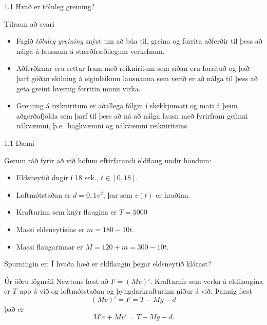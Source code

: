\begin{frame}{1.1 Hvað er töluleg greining?} \pause
\smallskip
\begin{block}{Tilraun að svari} 
\begin{itemize} 
\item Fagið {\it töluleg greining} snýst um að búa til, greina og forrita
aðferðir til þess að nálga á lausnum á stærðfræðilegum
verkefnum.\pause
\item  Aðferðirnar eru settar fram með reikniritum sem síðan eru
forrituð og það  þarf góðan skilning á eiginleikum lausnanna sem verið
er að nálga til þess að geta greint hvernig forritin munu virka.\pause
\item Greining á reikniritum er aðallega fólgin í skekkjumati og
mati á þeim aðgerðafjölda sem þarf til þess að ná að nálga lausn með
fyrirfram gefinni nákvæmni, \pause þ.e.~hagkvæmni og nákvæmni reikniritsins.
\end{itemize} 
\end{block}
\end{frame}

\begin{frame}{1.1 Dæmi}
 \begin{block}{}
Gerum ráð fyrir að við höfum eftirfarandi eldflaug undir höndum: \pause
\begin{itemize}
 \item Eldsneytið dugir í 18 sek., $t\in [0,18]$.
\item Loftmótstaðan er $d=0,1v^2$, þar sem $v(t)$ er hraðinn.
\item Krafturinn sem knýr flaugina er $T=5000$ 
\item Massi eldsneytisins er $m=180-10t$.
\item Massi flaugarinnar er $M = 120 + m = 300 - 10t$.
\end{itemize}
\pause

Spurningin er: Í hvaða hæð er eldflaugin þegar eldsneytið klárast?

\pause

Úr öðru lögmáli Newtons fæst að $F = (Mv)'$. \pause
Kraftarnir sem verka á eldflaugina er $T$ upp á við og 
loftmótstaðan og þyngdarkrafturinn niður á við. Þannig fæst
$$
  (Mv)' = F = T - Mg - d
$$\pause
það er
$$
M'v + Mv' = T - Mg -d.
$$
\end{block}
\end{frame}

